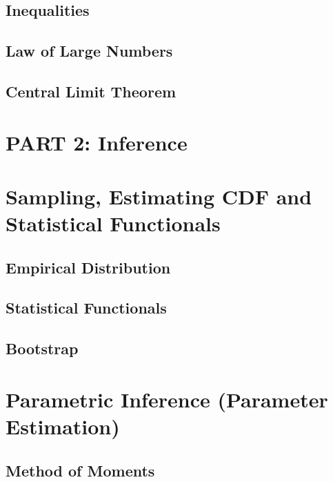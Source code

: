 \documentclass[
  openany]{book}
\theoremstyle{definition}
\theoremstyle{definition}
\theoremstyle{definition}
\theoremstyle{definition}
\theoremstyle{remark}
\begin{document}
\section{Inequalities}\label{inequalities}

\section{Law of Large Numbers}\label{law-of-large-numbers}

\section{Central Limit Theorem}\label{central-limit-theorem}

\chapter*{PART 2: Inference}\label{part-2-inference}


\chapter{Sampling, Estimating CDF and Statistical Functionals}\label{sampling-estimating-cdf-and-statistical-functionals}

\section{Empirical Distribution}\label{empirical-distribution}

\section{Statistical Functionals}\label{statistical-functionals}

\section{Bootstrap}\label{bootstrap}

\chapter{Parametric Inference (Parameter Estimation)}\label{parametric-inference-parameter-estimation}

\section{Method of Moments}\label{method-of-moments}
\end{document}
